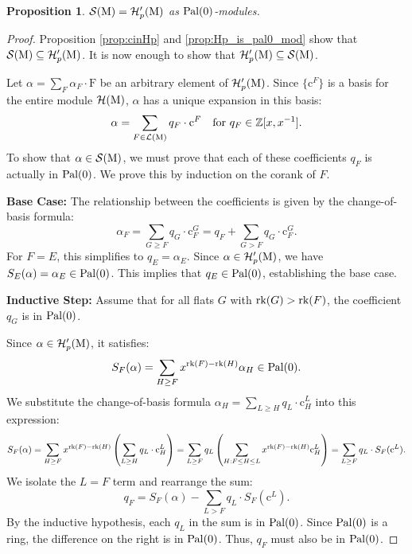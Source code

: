 \documentclass[11pt]{article}
\newcommand{\calL}{\mathcal{L}}
\newcommand{\calH}{\mathcal{H}}
\newcommand{\calS}{\mathcal{S}}
\newcommand{\rank}{\normalfont\text{rk}}
\newcommand{\M}{\normalfont\text{M}}
\newcommand{\ZZ}{\mathbb{Z}}
\newcommand{\Ebasis}[1]{\mathrm{#1}}
\newcommand{\Cbasis}[1]{\mathrm{c}^{#1}}
\newcommand{\CbasisSub}[2]{\mathrm{c}^{#1}_{#2}}
\newcommand{\pal}{\normalfont\text{Pal}}
\newtheorem{proposition}[theorem]{Proposition}
\theoremstyle{remark}
\begin{document}
\begin{proposition}\label{prop:SisHp}
    \(\calS(\M) = \calH'_p(\M)\) as \(\pal(0)\)-modules.
\end{proposition}
\begin{proof}
    Proposition \ref{prop:cinHp} and \ref{prop:Hp_is_pal0_mod}
    show that \(\calS(\M) \subseteq \calH'_p(\M)\).
    It is now enough to show that \(\calH'_p(\M) \subseteq \calS(\M)\).

    Let \(\alpha = \sum_F \alpha_F \cdot \Ebasis{F}\) be an arbitrary element of \(\calH'_p(\M)\). Since \(\{\Cbasis{F}\}\) is a basis for the entire module \(\calH(\M)\), \(\alpha\) has a unique expansion in this basis:
    \[ \alpha = \sum_{F \in \calL(\M)} q_F \cdot \Cbasis{F}\quad \text{for } q_F \in \ZZ[x, x^{-1}]. \]
    To show that \(\alpha \in \calS(\M)\), we must prove that each of these coefficients \(q_F\) is actually in
    \(\pal(0)\). We prove this by induction on the corank of \(F\).

    \textbf{Base Case:} The relationship between the coefficients is given by the change-of-basis formula:
    \[ \alpha_F = \sum_{G \ge F} q_G \cdot \CbasisSub{G}{F} = q_F + \sum_{G > F} q_G \cdot \CbasisSub{G}{F}. \]
    For \(F=E\), this simplifies to \(q_E = \alpha_E\). Since \(\alpha \in \calH'_p(\M)\),
    we have \(S_E(\alpha) = \alpha_E \in \pal(0)\). This implies that \(q_E \in \pal(0)\), establishing the base case.

    \textbf{Inductive Step:} Assume that for all flats \(G\) with \(\rank(G) > \rank(F)\),
    the coefficient \(q_G\) is in \(\pal(0)\).

    Since \(\alpha \in \calH'_p(\M)\), it satisfies:
    \[ S_F(\alpha) = \sum_{H \ge F} x^{\rank(F)-\rank(H)} \alpha_H \in \pal(0). \]
    We substitute the change-of-basis formula \(\alpha_H = \sum_{L \ge H} q_L \cdot \CbasisSub{L}{H}\) into this expression:
    \[ S_F(\alpha) = \sum_{H \ge F} x^{\rank(F)-\rank(H)} \left( \sum_{L \ge H} q_L \cdot \CbasisSub{L}{H} \right)
        = \sum_{L \ge F} q_L \left( \sum_{H: F \le H \le L} x^{\rank(F)-\rank(H)} \CbasisSub{L}{H} \right)
        = \sum_{L \ge F} q_L \cdot S_F(\Cbasis{L}). \]
    We isolate the \(L=F\) term and rearrange the sum:
    \[ q_F = S_F(\alpha) - \sum_{L > F} q_L \cdot S_F(\Cbasis{L}). \]
    By the inductive hypothesis, each \(q_L\) in the sum is in \(\pal(0)\).
    Since \(\pal(0)\) is a ring, the difference on the right is in \(\pal(0)\).
    Thus, \(q_F\) must also be in \(\pal(0)\).
\end{proof}
\end{document}
